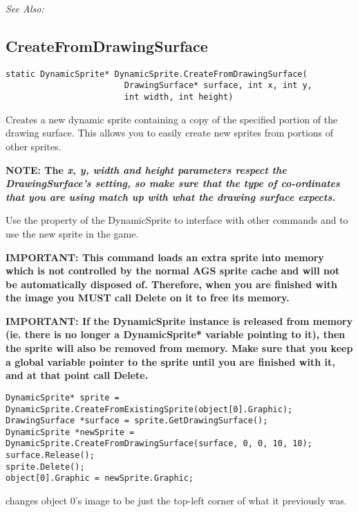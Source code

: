 \it{See Also:} 


\subsection{CreateFromDrawingSurface}\label{DynamicSprite.CreateFromDrawingSurface}%

\begin{verbatim}
static DynamicSprite* DynamicSprite.CreateFromDrawingSurface(
                        DrawingSurface* surface, int x, int y,
                        int width, int height)
\end{verbatim}
Creates a new dynamic sprite containing a copy of the specified portion of
the drawing surface. This allows you to easily create new sprites from portions
of other sprites.

\bf{NOTE:} The \it{x}, \it{y}, \it{width} and \it{height} parameters respect
the DrawingSurface's 
setting, so make sure that the type of co-ordinates that you are using match
up with what the drawing surface expects.

Use the  property of the DynamicSprite to
interface with other commands and to use the new sprite in the game.

\bf{IMPORTANT:} This command loads an extra sprite into memory which is not controlled
by the normal AGS sprite cache and will not be automatically disposed of. Therefore, when
you are finished with the image you \bf{MUST} call Delete on it to free its memory.

\bf{IMPORTANT:} If the DynamicSprite instance is released from memory (ie. there is
no longer a DynamicSprite* variable pointing to it), then the sprite will also be
removed from memory. Make sure that you keep a global variable pointer to the sprite
until you are finished with it, and at that point call Delete.

\begin{verbatim}
DynamicSprite* sprite = DynamicSprite.CreateFromExistingSprite(object[0].Graphic);
DrawingSurface *surface = sprite.GetDrawingSurface();
DynamicSprite *newSprite = DynamicSprite.CreateFromDrawingSurface(surface, 0, 0, 10, 10);
surface.Release();
sprite.Delete();
object[0].Graphic = newSprite.Graphic;
\end{verbatim}
changes object 0's image to be just the top-left corner of what it previously was.

